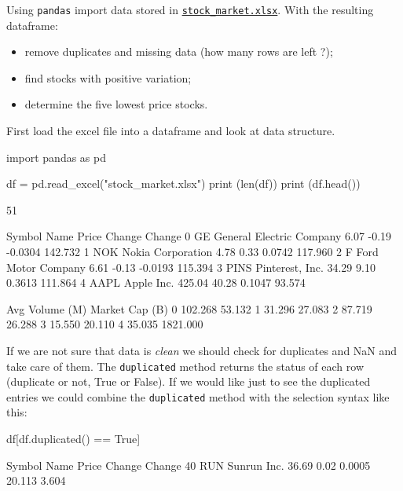 \begin{question}
Using \texttt{pandas} import data stored in \href{https://drive.google.com/file/d/1Uu9lQorvzM-1xwRKPNszaSqlCYAiY-gr/view?usp=sharing}{\texttt{stock\_market.xlsx}}. With the resulting dataframe:
\begin{itemize}
\item remove duplicates and missing data (how many rows are left ?);
\item find stocks with positive variation;
\item determine the five lowest price stocks.
\end{itemize}
\end{question}

\cprotEnv\begin{solution}
First load the excel file into a dataframe and look at data structure.

\begin{ipython}
import pandas as pd

df = pd.read_excel("stock_market.xlsx")
print (len(df))
print (df.head())
\end{ipython}
\begin{ioutput}
51

  Symbol                      Name   Price  Change  Change%
0     GE  General Electric Company    6.07   -0.19  -0.0304     142.732
1    NOK         Nokia Corporation    4.78    0.33   0.0742     117.960
2      F        Ford Motor Company    6.61   -0.13  -0.0193     115.394
3   PINS           Pinterest, Inc.   34.29    9.10   0.3613     111.864
4   AAPL                Apple Inc.  425.04   40.28   0.1047      93.574

   Avg Volume (M)  Market Cap (B)
0         102.268          53.132
1          31.296          27.083
2          87.719          26.288
3          15.550          20.110
4          35.035        1821.000
\end{ioutput}
        
If we are not sure that data is \emph{clean} we should check for duplicates and NaN and take care of them. The \texttt{duplicated} method returns the status of each row (duplicate or not, True or False). If we would like just to see the duplicated entries we could combine the \texttt{duplicated} method with the selection syntax like this:

\begin{ipython}
df[df.duplicated() == True]
\end{ipython}
\begin{ioutput}
   Symbol         Name  Price  Change  Change%
40    RUN  Sunrun Inc.  36.69    0.02   0.0005      20.113           3.604


\end{ioutput}
\end{solution}

